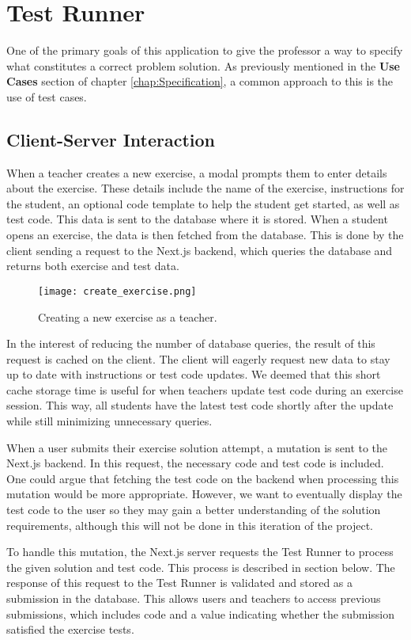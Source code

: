 \chapter{Test Runner} \label{chap:TestRunner}
One of the primary goals of this application to give the professor a way to specify what constitutes a correct problem solution.
As previously mentioned in the \textbf{Use Cases} section of chapter \ref{chap:Specification}, a common approach to this is the use of test cases.

\section{Client-Server Interaction}
When a teacher creates a new exercise, a modal prompts them to enter details about the exercise.
These details include the name of the exercise, instructions for the student, an optional code template to help the student get started, as well as test code.
This data is sent to the database where it is stored.
When a student opens an exercise, the data is then fetched from the database.
This is done by the client sending a request to the Next.js backend, which queries the database and returns both exercise and test data.

\begin{figure}[H]
    \centering
    \texttt{[image: create\_exercise.png]}
    \caption{Creating a new exercise as a teacher.}
    \label{fig:create_exercise}
\end{figure}

In the interest of reducing the number of database queries, the result of this request is cached on the client.
The client will eagerly request new data to stay up to date with instructions or test code updates.
We deemed that this short cache storage time is useful for when teachers update test code during an exercise session.
This way, all students have the latest test code shortly after the update while still minimizing unnecessary queries.

When a user submits their exercise solution attempt, a mutation is sent to the Next.js backend.
In this request, the necessary code and test code is included.
One could argue that fetching the test code on the backend when processing this mutation would be more appropriate.
However, we want to eventually display the test code to the user so they may gain a better understanding of the solution requirements, although this will not be done in this iteration of the project.

To handle this mutation, the Next.js server requests the Test Runner to process the given solution and test code.
This process is described in section \label{sec:test_runner_process} below.
The response of this request to the Test Runner is validated and stored as a submission in the database.
This allows users and teachers to access previous submissions, which includes code and a value indicating whether the submission satisfied the exercise tests.

